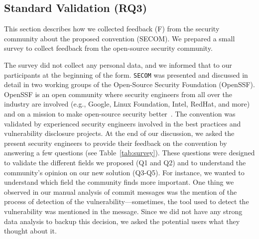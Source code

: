 \subsection{Standard Validation (RQ3)}

This section describes how we collected feedback (F) from the security community about the proposed convention (SECOM). We prepared a small survey to collect feedback from the open-source security community. 

The survey did not collect any personal data, and we informed that to our participants at the beginning of the form. \texttt{SECOM} was presented and discussed in detail in two working groups of the Open-Source Security Foundation (OpenSSF). 
OpenSSF is an open community where 
security engineers from all over the industry are involved (e.g., Google, Linux Foundation, Intel, RedHat, and more) and on a mission to 
make open-source security better~\cite{OPENSSF-MISSION}. The convention was validated by experienced security engineers involved in the best practices and vulnerability disclosure projects.
At the end
of our discussion, we asked the present security engineers
to provide their feedback on the convention by answering a few questions (see
Table~\ref{tab:survey}). These questions were designed to validate the different fields
we proposed (Q1 and Q2) and to understand the community's opinion on our new solution (Q3-Q5).
For instance, we wanted to understand which field the community finds more important. One 
thing we observed in our manual analysis of commit messages was the mention of the 
process of detection of the vulnerability---sometimes, the tool used to detect the 
vulnerability was mentioned in the message. Since we did not have any strong 
data analysis to backup this decision, we asked the potential users what they 
thought about it.

